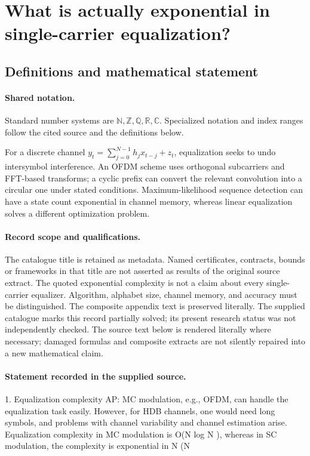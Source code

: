 \documentclass[11pt]{article}
\begin{document}
\section{What is actually exponential in single-carrier equalization?}\label{statement}

\subsection{Definitions and mathematical statement}

\paragraph{Shared notation.}Standard number systems are $\mathbb N,\mathbb Z,\mathbb Q,\mathbb R,\mathbb C$. Specialized notation and index ranges follow the cited source and the definitions below.


For a discrete channel $y_t=\sum_{j=0}^{N-1}h_jx_{t-j}+z_t$, equalization seeks to undo intersymbol interference. An OFDM scheme uses orthogonal subcarriers and FFT-based transforms; a cyclic prefix can convert the relevant convolution into a circular one under stated conditions. Maximum-likelihood sequence detection can have a state count exponential in channel memory, whereas linear equalization solves a different optimization problem.
\paragraph{Record scope and qualifications.}
The catalogue title is retained as metadata. Named certificates, contracts, bounds or frameworks in that title are not asserted as results of the original source extract.
The quoted exponential complexity is not a claim about every single-carrier equalizer. Algorithm, alphabet size, channel memory, and accuracy must be distinguished. The composite appendix text is preserved literally. The supplied catalogue marks this record partially solved; its present research status was not independently checked.
The source text below is rendered literally where necessary; damaged formulas and composite extracts are not silently repaired into a new mathematical claim.
\paragraph{Statement recorded in the supplied source.}
1. Equalization complexity AP: MC modulation, e.g., OFDM, can handle the equalization task easily. However, for HDB channels, one would need long symbols, and problems with channel variability and channel estimation arise. Equalization complexity in MC modulation is O(N log N ), whereas in SC modulation, the complexity is exponential in N (N
\end{document}
